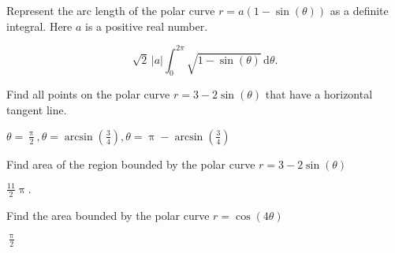 \documentclass[12pt,fleqn,answers]{exam}
\begin{document}
\begin{questions}

\newpage 
\question Represent the arc length of the polar curve $r = a (1-\sin(\theta))$
as a definite integral. Here $a$ is a positive real number.

\begin{solution}[3.5in]
  $$
  \sqrt{2}\, \left| a\right|  \int_0^{2 \pi}   \sqrt{1-\sin{(\theta)}}
  \, \mathrm{d} \theta.
  $$
\end{solution}

\question Find all points on the polar curve $r = 3 - 2 \sin(\theta)$
that have a horizontal tangent line.

\begin{solution}[3.5in]
 $\theta= \frac{\uppi}{2},
  \theta = \operatorname{arcsin}\left( \frac{3}{4}\right) ,
  \theta = \uppi - \operatorname{arcsin}\left( \frac{3}{4}\right)$
\end{solution}

\newpage 
\question Find area of the region bounded by the  polar curve 
$r = 3 - 2 \sin(\theta)$

\begin{solution}[3.5in]
 $\frac{11}{2} \uppi.$
\end{solution}

\question Find the area bounded by the polar curve $r = \cos(4 \theta)$
\begin{solution}[3.5in]
  $\frac{\uppi}{2}$
\end{solution}




\end{questions}

    
\end{document}
